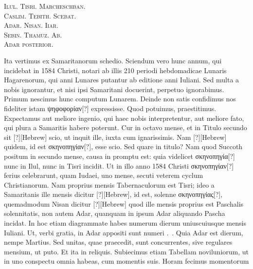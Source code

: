 %
\begin{center}
\providelength{\emenlen}
\parbox{\emenlen}{
  \textsc{Ilul. Tisri. Marcheschban.}\\
  \textsc{Caslim. Tebith. Scebat.}\\
  \textsc{Adar. Nisan. Iiar.}\\
  \textsc{Sebin. Thamuz. Ab.}\\
  \textsc{Adar posterior.}
}
\end{center}
%
Ita vertimus ex Samaritanorum schedio.
Sciendum vero hunc annum,
qui incidebat in 1584 Christi, notari ab illis 210 periodi hebdomadicae
Lunaris Hagarenorum, qui anni Lunares putantur ab editione
anni Iuliani.
Sed multa a nobis ignorantur, et nisi ipsi Samaritani
docuerint, perpetuo ignorabimus.
Primum nescimus hunc
computum Lunarem.
Deinde non satis confidimus nos fideliter
istam \textgreek{ψηφοφορίαν[?]} expressisse.
Quod potuimus, praestitimus.
Expectamus
aut meliore ingenio, qui haec nobis interpretentur, aut
meliore fato, qui plura a Samaritis habere poterunt.
Cur in
octavo mense, et in Titulo secundo sit \texthebrew{[?]}[Hebrew]
 scio, ut inquit ille,
iuxta cum ignarissimis.
Nam \texthebrew{[?]}[Hebrew] quidem,
 id est \textgreek{σκηνοπηγίαν[?]}, esse
scio.
Sed quare in titulo?
Nam quod Succoth positum in secundo
mense, causa in promptu est: quia videlicet \textgreek{σκηνοπηγία[?]}
 nunc in Ilul,
nunc in Tisri incidit. %
Ut in illo anno 1584 Christi
 \textgreek{σκηνοπηγίαν[?]} ferius
celebrarunt, quam Iudaei, uno mense, secuti veterem cyclum
Christianorum.
Nam proprius mensis Tabernaculorum est Tisri;
ideo a Samaritanis ille mensis dicitur \texthebrew{[?]}[Hebrew],
 id est, solenne \textgreek{σκηνοπηγίας[?]},
quemadmodum Nisan dicitur \texthebrew{[?]}[Hebrew] quod ille mensis proprius
est Paschalis solennitatis, non autem Adar, quanquam in
ipsum Adar aliquando Pascha incidat.
In hoc etiam diagrammate
habes numerum dierum uniuscuiusque mensis Iuliani.
Ut, verbi
gratia, in Adar appositi sunt numeri .~.
Quia Adar
est  dierum, nempe Martius.
Sed unitas, quae praecedit, sunt
concurrentes, sive regulares mensium, ut puto.
Et ita in reliquis.
Subiecimus etiam Tabellam noviluniorum, ut in uno conspectu
omnia habeas, cum momentis suis.
Horam fecimus momentorum

